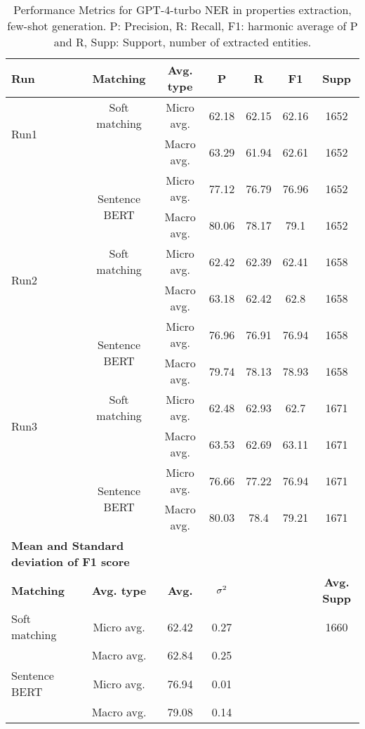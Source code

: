 \begin{table}[htbp]
\small
  \centering
  \caption{Performance Metrics for GPT-4-turbo NER in properties extraction, few-shot generation. P: Precision, R: Recall, F1: harmonic average of P and R, Supp: Support, number of extracted entities.}
  \begin{tabular}{lcccccc}
    \toprule
    \textbf{Run} & \textbf{Matching} & \textbf{Avg. type} & \textbf{P} & \textbf{R} & \textbf{F1} & \textbf{Supp} \\
    \midrule
    \multirow{2}{*}{Run1} & Soft matching & Micro avg. & 62.18 & 62.15 & 62.16 & 1652 \\
    & & Macro avg. & 63.29 & 61.94 & 62.61 & 1652 \\
    \cmidrule{2-7}
    & \multirow{2}{*}{Sentence BERT} & Micro avg. & 77.12 & 76.79 & 76.96 & 1652 \\
    & & Macro avg. & 80.06 & 78.17 & 79.1 & 1652 \\
    \midrule
    \multirow{2}{*}{Run2} & Soft matching & Micro avg. & 62.42 & 62.39 & 62.41 & 1658 \\
    & & Macro avg. & 63.18 & 62.42 & 62.8 & 1658 \\
    \cmidrule{2-7}
    & \multirow{2}{*}{Sentence BERT} & Micro avg. & 76.96 & 76.91 & 76.94 & 1658 \\
    & & Macro avg. & 79.74 & 78.13 & 78.93 & 1658 \\
    \midrule
    \multirow{2}{*}{Run3} & Soft matching & Micro avg. & 62.48 & 62.93 & 62.7 & 1671 \\
    & & Macro avg. & 63.53 & 62.69 & 63.11 & 1671 \\
    \cmidrule{2-7}
    & \multirow{2}{*}{Sentence BERT} & Micro avg. & 76.66 & 77.22 & 76.94 & 1671 \\
    & & Macro avg. & 80.03 & 78.4 & 79.21 & 1671 \\
    \midrule
    \multicolumn{2}{l}{\textbf{Mean and Standard deviation of F1 score}} & & & & & \\
    \midrule
    \textbf{Matching} & \textbf{Avg. type} & \textbf{Avg.} & $\sigma\textsuperscript{2}$ & & & \textbf{Avg. Supp}\\
    Soft matching & Micro avg. & 62.42 & 0.27 & & & 1660 \\
    & Macro avg. & 62.84 & 0.25 & & & \\
    Sentence BERT & Micro avg. & 76.94 & 0.01 & & & \\
    & Macro avg. & 79.08 & 0.14 & & & \\
    \bottomrule
  \end{tabular}
\end{table}

